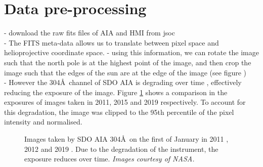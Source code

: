 \documentclass[a4paper,10pt]{report}
\begin{document}
\section{Data pre-processing}
- download the raw fits files of AIA and HMI from jsoc \\
- The FITS meta-data allows us to translate between pixel space and
helioprojective coordinate space.
- using this information, we can rotate the image such that the north pole is at
the highest point of the image, and then crop the image such that the edges of
the sun are at the edge of the image (see figure %
) \\

 - However the 304\AA \ channel of SDO AIA is degrading over time
 \cite{boerner_photometric_2014}, effectively reducing the exposure of the
 image. Figure \ref{fig:aia_degradation} shows a comparison in the exposures of
 images taken in 2011, 2015 and 2019 respectively. To account for this
 degradation, the image was clipped to the 95th percentile of the pixel
 intensity and normalised. 


 \begin{figure}[t]%
  \centering
  \qquad
  \qquad
  \label{fig:aia_degradation}
  \caption[]{
    Images taken by SDO AIA 304\AA \ on the first of January in
    2011 , 2012  and 2019
    . Due to the degradation of the instrument, the
    exposure reduces over time. \textit{Images courtesy of NASA.}}
\end{figure}






 
\end{document}
